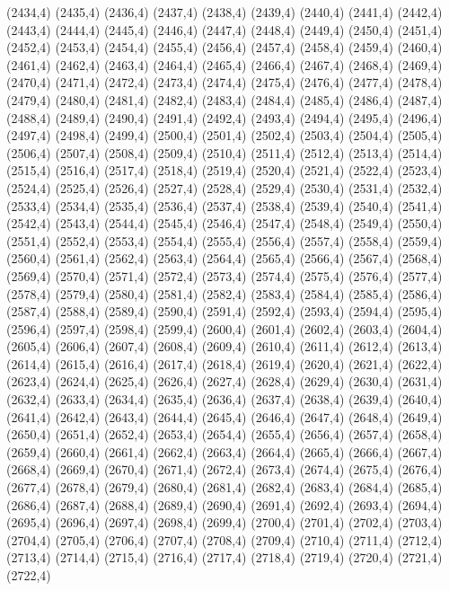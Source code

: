 (2434,4)
(2435,4)
(2436,4)
(2437,4)
(2438,4)
(2439,4)
(2440,4)
(2441,4)
(2442,4)
(2443,4)
(2444,4)
(2445,4)
(2446,4)
(2447,4)
(2448,4)
(2449,4)
(2450,4)
(2451,4)
(2452,4)
(2453,4)
(2454,4)
(2455,4)
(2456,4)
(2457,4)
(2458,4)
(2459,4)
(2460,4)
(2461,4)
(2462,4)
(2463,4)
(2464,4)
(2465,4)
(2466,4)
(2467,4)
(2468,4)
(2469,4)
(2470,4)
(2471,4)
(2472,4)
(2473,4)
(2474,4)
(2475,4)
(2476,4)
(2477,4)
(2478,4)
(2479,4)
(2480,4)
(2481,4)
(2482,4)
(2483,4)
(2484,4)
(2485,4)
(2486,4)
(2487,4)
(2488,4)
(2489,4)
(2490,4)
(2491,4)
(2492,4)
(2493,4)
(2494,4)
(2495,4)
(2496,4)
(2497,4)
(2498,4)
(2499,4)
(2500,4)
(2501,4)
(2502,4)
(2503,4)
(2504,4)
(2505,4)
(2506,4)
(2507,4)
(2508,4)
(2509,4)
(2510,4)
(2511,4)
(2512,4)
(2513,4)
(2514,4)
(2515,4)
(2516,4)
(2517,4)
(2518,4)
(2519,4)
(2520,4)
(2521,4)
(2522,4)
(2523,4)
(2524,4)
(2525,4)
(2526,4)
(2527,4)
(2528,4)
(2529,4)
(2530,4)
(2531,4)
(2532,4)
(2533,4)
(2534,4)
(2535,4)
(2536,4)
(2537,4)
(2538,4)
(2539,4)
(2540,4)
(2541,4)
(2542,4)
(2543,4)
(2544,4)
(2545,4)
(2546,4)
(2547,4)
(2548,4)
(2549,4)
(2550,4)
(2551,4)
(2552,4)
(2553,4)
(2554,4)
(2555,4)
(2556,4)
(2557,4)
(2558,4)
(2559,4)
(2560,4)
(2561,4)
(2562,4)
(2563,4)
(2564,4)
(2565,4)
(2566,4)
(2567,4)
(2568,4)
(2569,4)
(2570,4)
(2571,4)
(2572,4)
(2573,4)
(2574,4)
(2575,4)
(2576,4)
(2577,4)
(2578,4)
(2579,4)
(2580,4)
(2581,4)
(2582,4)
(2583,4)
(2584,4)
(2585,4)
(2586,4)
(2587,4)
(2588,4)
(2589,4)
(2590,4)
(2591,4)
(2592,4)
(2593,4)
(2594,4)
(2595,4)
(2596,4)
(2597,4)
(2598,4)
(2599,4)
(2600,4)
(2601,4)
(2602,4)
(2603,4)
(2604,4)
(2605,4)
(2606,4)
(2607,4)
(2608,4)
(2609,4)
(2610,4)
(2611,4)
(2612,4)
(2613,4)
(2614,4)
(2615,4)
(2616,4)
(2617,4)
(2618,4)
(2619,4)
(2620,4)
(2621,4)
(2622,4)
(2623,4)
(2624,4)
(2625,4)
(2626,4)
(2627,4)
(2628,4)
(2629,4)
(2630,4)
(2631,4)
(2632,4)
(2633,4)
(2634,4)
(2635,4)
(2636,4)
(2637,4)
(2638,4)
(2639,4)
(2640,4)
(2641,4)
(2642,4)
(2643,4)
(2644,4)
(2645,4)
(2646,4)
(2647,4)
(2648,4)
(2649,4)
(2650,4)
(2651,4)
(2652,4)
(2653,4)
(2654,4)
(2655,4)
(2656,4)
(2657,4)
(2658,4)
(2659,4)
(2660,4)
(2661,4)
(2662,4)
(2663,4)
(2664,4)
(2665,4)
(2666,4)
(2667,4)
(2668,4)
(2669,4)
(2670,4)
(2671,4)
(2672,4)
(2673,4)
(2674,4)
(2675,4)
(2676,4)
(2677,4)
(2678,4)
(2679,4)
(2680,4)
(2681,4)
(2682,4)
(2683,4)
(2684,4)
(2685,4)
(2686,4)
(2687,4)
(2688,4)
(2689,4)
(2690,4)
(2691,4)
(2692,4)
(2693,4)
(2694,4)
(2695,4)
(2696,4)
(2697,4)
(2698,4)
(2699,4)
(2700,4)
(2701,4)
(2702,4)
(2703,4)
(2704,4)
(2705,4)
(2706,4)
(2707,4)
(2708,4)
(2709,4)
(2710,4)
(2711,4)
(2712,4)
(2713,4)
(2714,4)
(2715,4)
(2716,4)
(2717,4)
(2718,4)
(2719,4)
(2720,4)
(2721,4)
(2722,4)

